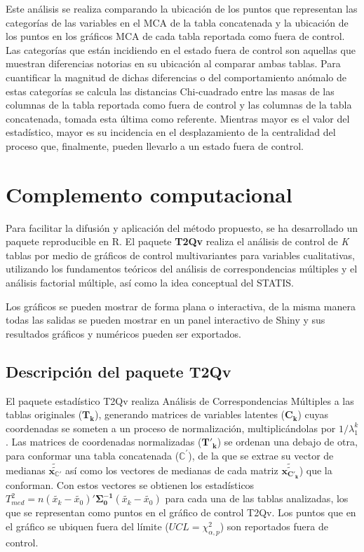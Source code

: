 \documentclass[mathematics,article,submit,moreauthors,pdftex]{mdpi}
\begin{document}
Este análisis se realiza comparando la ubicación de los puntos que
representan las categorías de las variables en el MCA de la tabla
concatenada y la ubicación de los puntos en los gráficos MCA de cada
tabla reportada como fuera de control. Las categorías que están
incidiendo en el estado fuera de control son aquellas que muestran
diferencias notorias en su ubicación al comparar ambas tablas. Para
cuantificar la magnitud de dichas diferencias o del comportamiento
anómalo de estas categorías se calcula las distancias Chi-cuadrado entre
las masas de las columnas de la tabla reportada como fuera de control y
las columnas de la tabla concatenada, tomada esta última como referente.
Mientras mayor es el valor del estadístico, mayor es su incidencia en el
desplazamiento de la centralidad del proceso que, finalmente, pueden
llevarlo a un estado fuera de control.

\hypertarget{complemento-computacional}{%
\section{Complemento computacional}\label{complemento-computacional}}

Para facilitar la difusión y aplicación del método propuesto, se ha
desarrollado un paquete reproducible en R. El paquete \textbf{T2Qv}
\citep{T2Qv} realiza el análisis de control de \emph{K} tablas por medio
de gráficos de control multivariantes para variables cualitativas,
utilizando los fundamentos teóricos del análisis de correspondencias
múltiples y el análisis factorial múltiple, así como la idea conceptual
del STATIS.

Los gráficos se pueden mostrar de forma plana o interactiva, de la misma
manera todas las salidas se pueden mostrar en un panel interactivo de
Shiny y sus resultados gráficos y numéricos pueden ser exportados.

\hypertarget{descripciuxf3n-del-paquete-t2qv}{%
\subsection{Descripción del paquete
T2Qv}\label{descripciuxf3n-del-paquete-t2qv}}

El paquete estadístico T2Qv realiza Análisis de Correspondencias
Múltiples a las tablas originales (\(\mathbf{T_k}\)), generando matrices
de variables latentes (\(\mathbf{C_k}\)) cuyas coordenadas se someten a
un proceso de normalización, multiplicándolas por \(1/\lambda_{1}^{k}\).
Las matrices de coordenadas normalizadas (\(\mathbf{T'_k}\)) se ordenan
una debajo de otra, para conformar una tabla concatenada
(\(\mathbb{C}^{'}\)), de la que se extrae su vector de medianas
\(\tilde{\tilde{\mathbf{x}_{\mathbb{C'}}}}\) así como los vectores de
medianas de cada matriz
\(\tilde{\tilde{\mathbf{x}_{\mathbf{C'_{k}}}}}\)) que la conforman. Con
estos vectores se obtienen los estadísticos
\(T^2_{med}=n (\tilde{x_{k}}-\tilde{x_{0}})'\mathbf{\Sigma_{0}^{-1}}(\tilde{x_{k}}-\tilde{x_{0}})\)
para cada una de las tablas analizadas, los que se representan como
puntos en el gráfico de control T2Qv. Los puntos que en el gráfico se
ubiquen fuera del límite (\(UCL= \chi_{\alpha,p}^2\)) son reportados
fuera de control.
\end{document}
